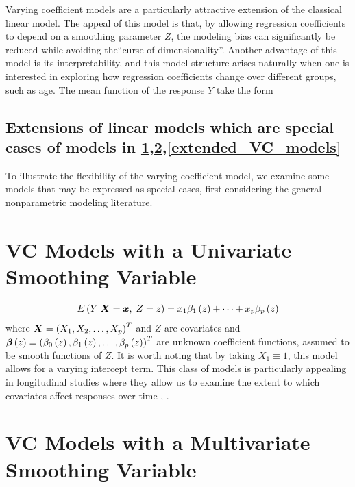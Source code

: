 \documentclass[12pt]{article}
\newcommand*\outlineskeleton{\color{green}}
\newcommand{\bfbeta}{\mbox{\boldmath $\beta$}}
\newcommand{\bfx}{\mbox{\boldmath $x$}}
\newcommand{\bfX}{\mbox{\boldmath $X$}}
\begin{document}
Varying coefficient models are a particularly attractive extension of the classical linear model. The appeal of this model is that, by allowing regression coefficients to depend on a smoothing parameter $Z$, the modeling bias can significantly be reduced while avoiding the``curse of dimensionality''. Another advantage of this model is its interpretability, and this model structure arises naturally when one is interested in exploring how regression coefficients change over different groups, such as age. The mean function of the response $Y$ take the form

\subsection{{\outlineskeleton Extensions of linear models which are special cases of models in \ref{univariate_VC_models},\ref{multivariate_VC_models},\ref{extended_VC_models}}}
To illustrate the flexibility of the varying coefficient model, we examine some models that may be expressed as special cases, first considering the general nonparametric modeling literature. 


\section{{\outlineskeleton VC Models with a Univariate Smoothing Variable}} \label{univariate_VC_models}

\begin{equation} \label{eq:VC_mean_function_single_smoothing_covariate}
E\left(Y \vert \bfX=\bfx,\;Z = z \right) = x_1\beta_1\left(z\right) + \dots  + x_p\beta_p\left(z\right)
\end{equation}
\noindent
where $\bfX = \left(X_1, X_2, \dots, X_p\right)^T$ and $Z$ are covariates and $\bfbeta\left(z\right) = \left( \beta_0\left(z\right), \beta_1\left(z\right),\dots,\beta_p\left(z\right) \right)^T$ are unknown coefficient functions, assumed to be smooth functions of $Z$. It is worth noting that by taking $X_1 \equiv 1$, this model allows for a varying intercept term. This class of models is particularly appealing in longitudinal studies where they allow us to examine the extent to which covariates affect responses over time \cite{hoover1998nonparametric}, \cite{fan2000two}. 

\section{{\outlineskeleton VC Models with a Multivariate Smoothing Variable}} \label{multivariate_VC_models}
\end{document}
